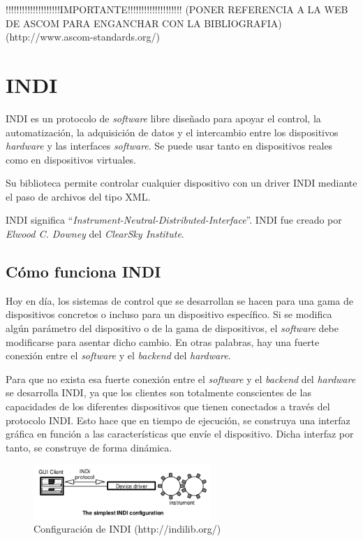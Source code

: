 !!!!!!!!!!!!!!!!!!!!IMPORTANTE!!!!!!!!!!!!!!!!!!!!
(PONER REFERENCIA A LA WEB DE ASCOM PARA ENGANCHAR CON LA BIBLIOGRAFIA)  (http://www.ascom-standards.org/)

\section{INDI}
INDI es un protocolo de \textit{software} libre diseñado para apoyar el control, la automatización, la adquisición de datos y el intercambio entre los dispositivos \textit{hardware} y las interfaces \textit{software}. Se puede usar tanto en dispositivos reales como en dispositivos virtuales.

Su biblioteca permite controlar cualquier dispositivo con un driver INDI mediante el paso de archivos del tipo XML.

INDI significa “\textit{Instrument-Neutral-Distributed-Interface}”. INDI fue creado por \textit{Elwood C. Downey} del \textit{ClearSky Institute}.

\subsection{Cómo funciona INDI}
Hoy en día, los sistemas de control que se desarrollan se hacen para una gama de dispositivos concretos o incluso para un dispositivo específico. Si se modifica algún parámetro del dispositivo o de la gama de dispositivos, el \textit{software} debe modificarse para asentar dicho cambio. En otras palabras, hay una fuerte conexión entre el \textit{software} y el \textit{backend} del \textit{hardware}.

Para que no exista esa fuerte conexión entre el \textit{software} y el \textit{backend} del \textit{hardware} se desarrolla INDI,  ya que los clientes son totalmente conscientes de las capacidades de los diferentes dispositivos que tienen conectados a través del protocolo INDI. Esto hace que en tiempo de ejecución, se construya una interfaz gráfica en función a las características que envíe el dispositivo. Dicha interfaz por tanto, se construye de forma dinámica.

\begin{figure}[htb]
\centering
\includegraphics[width=0.6\textwidth]{./imagenes/funcionINDI}
\caption{Configuración de INDI (http://indilib.org/)} \label{fig:funcionINDI}
\end{figure}

